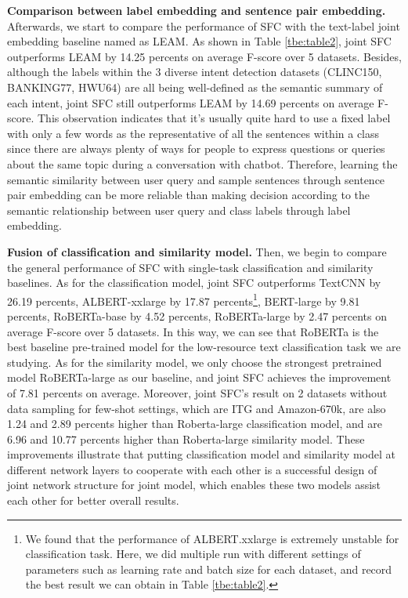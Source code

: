 \documentclass[letterpaper]{article} %
\begin{document}
  \textbf{Comparison  between  label  embedding  and  sentence  pair embedding.}
  Afterwards,  we  start  to  compare the performance of SFC with the text-label
  joint  embedding  baseline  named as LEAM. As shown in Table \ref{tbe:table2},
  joint  SFC outperforms LEAM by 14.25 percents on average F-score over 5
  datasets.  Besides,  although the labels within the 3 diverse intent detection
  datasets  (CLINC150,  BANKING77,  HWU64)  are  all  being  well-defined as the
  semantic  summary  of  each intent, joint SFC still outperforms LEAM by
  14.69  percents  on  average  F-score.  This  observation  indicates that it's
  usually  quite  hard  to  use  a  fixed  label  with  only  a few words as the
  representative  of  all  the  sentences  within a class since there are always
  plenty of ways for people to express questions or queries about the same topic
  during   a   conversation  with  chatbot.  Therefore,  learning  the  semantic
  similarity  between  user  query  and  sample  sentences through sentence pair
  embedding  can be more reliable than making decision according to the semantic
  relationship between user query and class labels through label embedding.

  \textbf{Fusion  of  classification  and  similarity  model.} Then, we begin to
  compare  the  general  performance  of SFC with single-task classification and
  similarity  baselines.  As  for  the  classification  model,  joint SFC
  outperforms    TextCNN    by   26.19   percents,   ALBERT-xxlarge   by   17.87
  percents\footnote{We found that the performance of ALBERT.xxlarge is extremely
  unstable  for  classification  task.  Here, we did multiple run with different
  settings  of parameters such as learning rate and batch size for each dataset,
  and  record  the  best  result  we  can  obtain  in  Table \ref{tbe:table2}.},
  BERT-large  by  9.81 percents, RoBERTa-base by 4.52 percents, RoBERTa-large by
  2.47 percents on average F-score over 5 datasets. In this way, we can see that
  RoBERTa  is  the  best  baseline  pre-trained  model for the low-resource text
  classification  task  we  are  studying.  As for the similarity model, we only
  choose  the  strongest  pretrained  model  RoBERTa-large  as our baseline, and
  joint  SFC  achieves  the  improvement  of  7.81  percents  on average.
  Moreover,  joint  SFC's  result on 2 datasets without data sampling for
  few-shot  settings,  which  are  ITG  and  Amazon-670k, are also 1.24 and 2.89
  percents  higher  than  Roberta-large  classification  model, and are 6.96 and
  10.77  percents higher than Roberta-large similarity model. These improvements
  illustrate that putting classification model and similarity model at different
  network  layers  to  cooperate  with  each  other  is  a  successful design of
  joint network structure for joint model, which enables these two models
  assist each other for better overall results.
\end{document}
